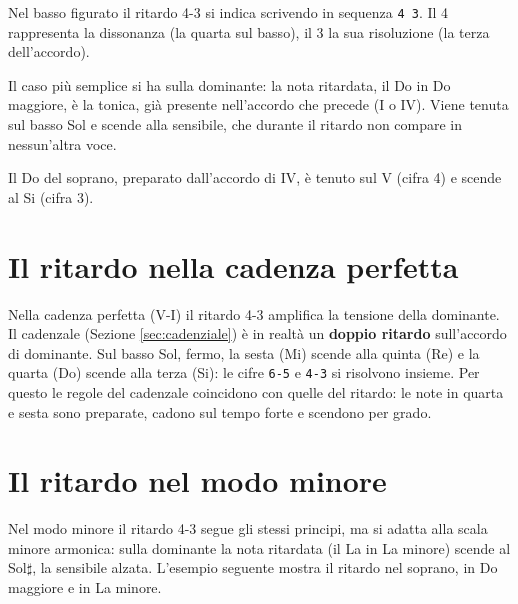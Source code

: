 \begin{regola}
	\label{reg:cifratura_ritardo}
	Nel basso figurato il ritardo 4-3 si indica scrivendo in sequenza \texttt{4 3}. Il 4 rappresenta la dissonanza (la quarta sul basso), il 3 la sua risoluzione (la terza dell'accordo).
\end{regola}

Il caso più semplice si ha sulla dominante: la nota ritardata, il Do in Do maggiore, è la tonica, già presente nell'accordo che precede (I o IV). Viene tenuta sul basso Sol e scende alla sensibile, che durante il ritardo non compare in nessun'altra voce.

\begin{esempio}
	\label{ex:sospensione_43}
	Il Do del soprano, preparato dall'accordo di IV, è tenuto sul V (cifra 4) e scende al Si (cifra 3).
\end{esempio}

\section{Il ritardo nella cadenza perfetta}
\label{subsec:ritardo_cadenza}

Nella cadenza perfetta (V-I) il ritardo 4-3 amplifica la tensione della dominante. Il  cadenzale (Sezione \ref{sec:cadenziale}) è in realtà un \textbf{doppio ritardo} sull'accordo di dominante. Sul basso Sol, fermo, la sesta (Mi) scende alla quinta (Re) e la quarta (Do) scende alla terza (Si): le cifre \texttt{6-5} e \texttt{4-3} si risolvono insieme. Per questo le regole del  cadenzale coincidono con quelle del ritardo: le note in quarta e sesta sono preparate, cadono sul tempo forte e scendono per grado.

\section{Il ritardo nel modo minore}
\label{subsec:ritardo_minore}

Nel modo minore il ritardo 4-3 segue gli stessi principi, ma si adatta alla scala minore armonica: sulla dominante la nota ritardata (il La in La minore) scende al Sol$\sharp$, la sensibile alzata. L'esempio seguente mostra il ritardo nel soprano, in Do maggiore e in La minore.

\begin{esempio}
	\label{ex:ritardo_4_3_s}
\end{esempio}

